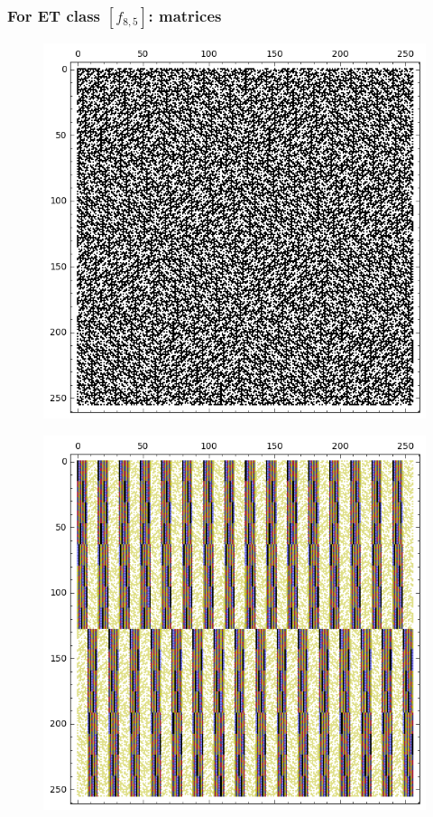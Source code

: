 \documentclass[pdf,sprung,slideColor,nocolorBG]{beamer}
\begin{document}
\begin{frame}
\frametitle{For ET class $[f_{8,5}]$: matrices}
\begin{figure}
\centering
\begin{minipage}{.48\textwidth}
  \centering
  \includegraphics[width=.9\linewidth]{../matrix_plot/c8_5_weight_class_matrix.png}
  \label{fig:8_5_weight_class_matrix}
\end{minipage}%
\begin{minipage}{.48\textwidth}
  \centering
  \includegraphics[width=.9\linewidth]{../matrix_plot/c8_5_bent_cayley_graph_index_matrix.png}
  \label{fig:8_5_bent_cayley_graph_index_matrix}
\end{minipage}
\end{figure}
\end{frame}
\end{document}
